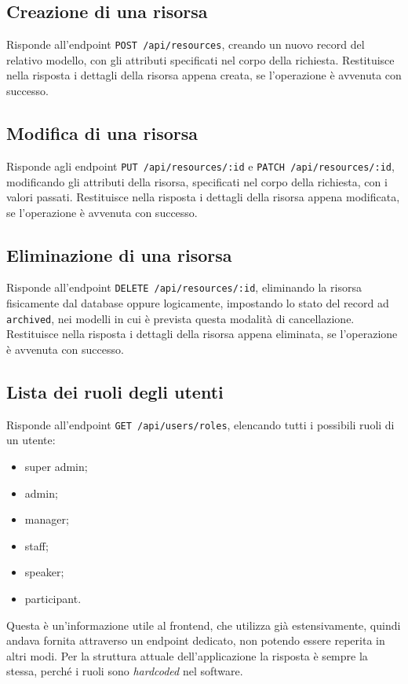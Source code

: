 \subsection{Creazione di una risorsa} \label{api:creazione}
Risponde all'endpoint \verb|POST /api/resources|, creando un nuovo record del relativo modello, con gli attributi specificati nel corpo della richiesta. Restituisce nella risposta i dettagli della risorsa appena creata, se l'operazione è avvenuta con successo.

\subsection{Modifica di una risorsa} \label{api:modifica}
Risponde agli endpoint \verb|PUT /api/resources/:id| e \verb|PATCH /api/resources/:id|, modificando gli attributi della risorsa, specificati nel corpo della richiesta, con i valori passati. Restituisce nella risposta i dettagli della risorsa appena modificata, se l'operazione è avvenuta con successo.

\subsection{Eliminazione di una risorsa} \label{api:eliminazione}
Risponde all'endpoint \verb|DELETE /api/resources/:id|, eliminando la risorsa fisicamente dal database oppure logicamente, impostando lo stato del record ad \verb|archived|, nei modelli in cui è prevista questa modalità di cancellazione. Restituisce nella risposta i dettagli della risorsa appena eliminata, se l'operazione è avvenuta con successo.

\subsection{Lista dei ruoli degli utenti} \label{api:utenti-lista-ruoli}
Risponde all'endpoint \verb|GET /api/users/roles|, elencando tutti i possibili ruoli di un utente:
\begin{itemize}
	\item super admin;
	\item admin;
	\item manager;
	\item staff;
	\item speaker;
	\item participant.
\end{itemize}
Questa è un'informazione utile al frontend, che utilizza già estensivamente, quindi andava fornita attraverso un endpoint dedicato, non potendo essere reperita in altri modi. Per la struttura attuale dell'applicazione la risposta è sempre la stessa, perché i ruoli sono \emph{hardcoded} nel software.

